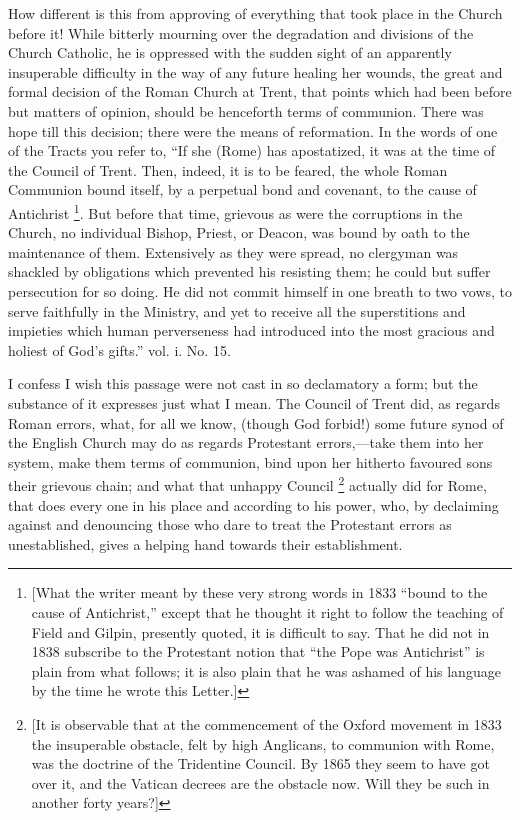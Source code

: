 How different is this from approving of
everything that took place in the Church before it! While bitterly
mourning over the degradation and divisions of the Church Catholic, he
is oppressed with the sudden sight of an apparently insuperable
difficulty in the way of any future healing her wounds, the great and
formal decision of the Roman Church at Trent, that points which had
been before but matters of opinion, should be henceforth terms of
communion. There was hope till this decision; there were the means of
reformation. In the words of one of the Tracts you refer to, ``If she
(Rome) has apostatized, it was at the time of the Council of Trent.
Then, indeed, it is to be feared, the whole Roman Communion bound
itself, by a perpetual bond and covenant, to the cause of Antichrist \footnote{[What the writer meant by these very strong words in 1833 ``bound
to the cause of Antichrist,'' except that he thought it right to
follow the teaching of Field and Gilpin, presently quoted, it is
difficult to say. That he did not in 1838 subscribe to the Protestant
notion that ``the Pope was Antichrist'' is plain from what follows;
it is also plain that he was ashamed of his language by the time he
wrote this Letter.]}. But before that time, grievous as were the corruptions in
the Church, no individual Bishop, Priest, or Deacon, was bound
by oath to the maintenance of them. Extensively as they were spread,
no clergyman was shackled by obligations which prevented his resisting
them; he could but suffer persecution for so doing. He did not commit
himself in one breath to two vows, to serve faithfully in the
Ministry, and yet to receive all the superstitions and impieties which
human perverseness had introduced into the most gracious and holiest
of God's gifts.'' vol. i. No. 15.

I confess I wish this passage were not cast in so
declamatory a form; but the substance of it expresses just what I
mean. The Council of Trent did, as regards Roman errors, what, for all
we know, (though God forbid!) some future synod of the English Church
may do as regards Protestant errors,—take them into her system, make
them terms of communion, bind upon her hitherto favoured sons their
grievous chain; and what that unhappy Council \footnote{[It is observable that at the commencement of the Oxford movement in
1833 the insuperable obstacle, felt by high Anglicans, to communion
with Rome, was the doctrine of the Tridentine Council. By 1865 they
seem to have got over it, and the Vatican decrees are the obstacle
now. Will they be such in another forty years?]} actually did
for Rome, that does every one in his place and according to his power,
who, by declaiming against and denouncing those who dare to treat the
Protestant errors as unestablished, gives a helping hand towards their
establishment.

